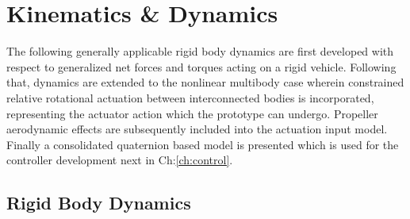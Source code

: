\chapter{Kinematics \& Dynamics}
\label{ch:dynamics}
The following generally applicable rigid body dynamics are first developed with respect to generalized net forces and torques acting on a rigid vehicle. Following that, dynamics are extended to the nonlinear multibody case wherein constrained relative rotational actuation between interconnected bodies is incorporated, representing the actuator action which the prototype can undergo. Propeller aerodynamic effects are subsequently included into the actuation input model. Finally a consolidated quaternion based model is presented which is used for the controller development next in Ch:\ref{ch:control}.
\section{Rigid Body Dynamics}
\label{sec:dynamics.rigidbody}
